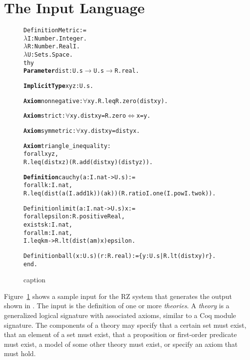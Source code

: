 \section{The Input Language}
\label{sec:input-language}

\begin{figure}[htbp]
\begin{alltt}
Definition Metric :=
  \ensuremath{\lambda}I : Number.Integer. 
  \ensuremath{\lambda}R : Number.Real I.
  \ensuremath{\lambda}U : Sets.Space.
	thy
	  \textbf{Parameter} dist : U.s \ensuremath{\to} U.s \ensuremath{\to} R.real.

	  \textbf{Implicit Type} x y z : U.s.

	  \textbf{Axiom} nonnegative: \ensuremath{\forall} x y. R.leq R.zero (dist x y).

	  \textbf{Axiom} strict: \ensuremath{\forall}x y. dist x y = R.zero \ensuremath{\Leftrightarrow} x = y.

	  \textbf{Axiom} symmetric:  \ensuremath{\forall}x y. dist x y = dist y x.

	  \textbf{Axiom} triangle_inequality:
	    forall x y z,
	      R.leq (dist x z) (R.add (dist x y) (dist y z)).

	  \textbf{Definition} cauchy (a : I.nat -> U.s) :=
	    forall k : I.nat,
	      R.leq (dist (a (I.add1 k)) (a k)) (R.ratio I.one (I.pow I.two k)).

	  Definition limit (a : I.nat -> U.s) x :=
	    forall epsilon : R.positiveReal,
	      exists k : I.nat,
	        forall m : I.nat,
	          I.leq k m  -> R.lt (dist (a m) x) epsilon.

	  Definition ball (x : U.s) (r : R.real) := \{y : U.s | R.lt (dist x y) r\}.
	end.
\end{alltt}
	\caption{caption}
	\label{fig:typicalinput}
\end{figure}

Figure~\ref{fig:typicalinput} shows a sample input for the RZ system that
generates the output shown in . The input is the
definition of one or more \emph{theories}. A \emph{theory} is a generalized
logical signature with associated axioms, similar to a Coq module signature.
The components of a theory may specify that a certain set must exist, that an
element of a set must exist, that a proposition or first-order predicate must
exist, a model of some other theory must exist, or specify an axiom that must
hold.

